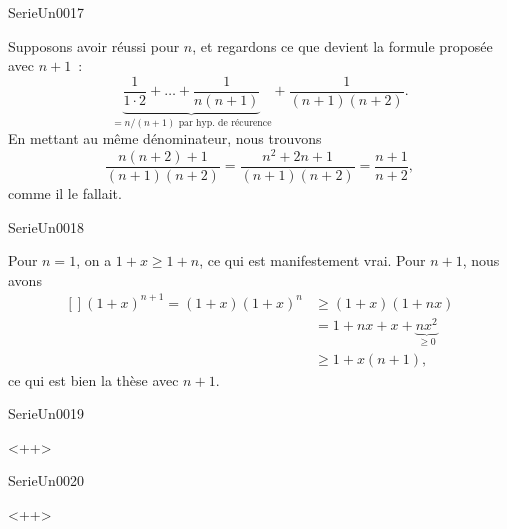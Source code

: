 \documentclass{article}
\begin{document}
\begin{corrige}{SerieUn0017}

	Supposons avoir réussi pour $n$, et regardons ce que devient la formule proposée avec $n+1$~:
	\begin{equation}
		\underbrace{\frac{1}{ 1\cdot 2}+\ldots+\frac{1}{ n(n+1) }}_{\text{$=n/(n+1)$ par hyp. de récurence}}+\frac{1}{ (n+1)(n+2) }.
	\end{equation}
	En mettant au même dénominateur, nous trouvons
	\begin{equation}
		\frac{ n(n+2)+1 }{ (n+1)(n+2) }=\frac{ n^2+2n+1 }{ (n+1)(n+2) }=\frac{ n+1 }{ n+2 },
	\end{equation}
	comme il le fallait.

\end{corrige}


\begin{corrige}{SerieUn0018}

	Pour $n=1$, on a $1+x\geq 1+n$, ce qui est manifestement vrai. Pour $n+1$, nous avons
	\begin{equation}
		\begin{aligned}[]
			(1+x)^{n+1}=(1+x)(1+x)^n&\geq (1+x)(1+nx)\\
							&=1+nx+x+\underbrace{nx^2}_{\geq 0}\\
							&\geq 1+x(n+1),
		\end{aligned}
	\end{equation}
	ce qui est bien la thèse avec $n+1$.

\end{corrige}


\begin{corrige}{SerieUn0019}

<++>

\end{corrige}%


\begin{corrige}{SerieUn0020}

<++>

\end{corrige}%
\end{document}
